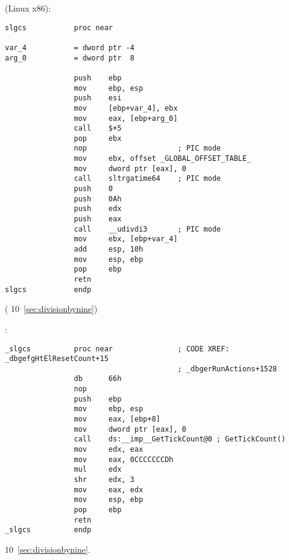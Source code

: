   (Linux x86):

\begin{lstlisting}
slgcs           proc near

var_4           = dword ptr -4
arg_0           = dword ptr  8

                push    ebp
                mov     ebp, esp
                push    esi
                mov     [ebp+var_4], ebx
                mov     eax, [ebp+arg_0]
                call    $+5
                pop     ebx
                nop                     ; PIC mode
                mov     ebx, offset _GLOBAL_OFFSET_TABLE_
                mov     dword ptr [eax], 0
                call    sltrgatime64    ; PIC mode
                push    0
                push    0Ah
                push    edx
                push    eax
                call    __udivdi3       ; PIC mode
                mov     ebx, [ebp+var_4]
                add     esp, 10h
                mov     esp, ebp
                pop     ebp
                retn
slgcs           endp
\end{lstlisting}

(   10~\ref{sec:divisionbynine})

:

\begin{lstlisting}
_slgcs          proc near               ; CODE XREF: _dbgefgHtElResetCount+15
                                        ; _dbgerRunActions+1528
                db      66h
                nop
                push    ebp
                mov     ebp, esp
                mov     eax, [ebp+8]
                mov     dword ptr [eax], 0
                call    ds:__imp__GetTickCount@0 ; GetTickCount()
                mov     edx, eax
                mov     eax, 0CCCCCCCDh
                mul     edx
                shr     edx, 3
                mov     eax, edx
                mov     esp, ebp
                pop     ebp
                retn
_slgcs          endp
\end{lstlisting}

   10~\ref{sec:divisionbynine}.


